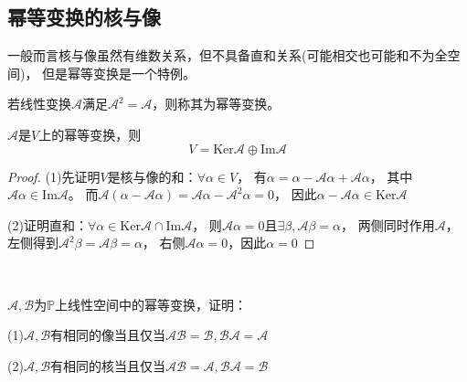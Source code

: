 \subsection{幂等变换的核与像}

一般而言核与像虽然有维数关系，但不具备直和关系(可能相交也可能和不为全空间)，
但是幂等变换是一个特例。

\begin{definition}[幂等变换]
  若线性变换$\mathcal{A}$满足$\mathcal{A}^2 = \mathcal{A}$，则称其为幂等变换。
\end{definition}

\begin{theorem}[幂等变换核像空间分解]
  $\mathcal{A}$是$V$上的幂等变换，则
  \begin{equation*}
    V = \mathrm{Ker}\mathcal{A} \oplus \mathrm{Im}\mathcal{A}
  \end{equation*}
\end{theorem}

\begin{proof}
  (1)先证明$V$是核与像的和：$\forall \alpha \in V$，
  有$\alpha = \alpha - \mathcal{A} \alpha + \mathcal{A} \alpha$，
  其中$\mathcal{A} \alpha \in \mathrm{Im}\mathcal{A}$。
  而$\mathcal{A}(\alpha - \mathcal{A} \alpha) = \mathcal{A} \alpha - \mathcal{A}^2 \alpha = 0$，
  因此$\alpha - \mathcal{A}\alpha \in \mathrm{Ker}\mathcal{A}$

  (2)证明直和：$\forall \alpha \in \mathrm{Ker}\mathcal{A} \cap \text{Im}\mathcal{A}$，
  则$\mathcal{A} \alpha = 0$且$\exists \beta, \mathcal{A} \beta = \alpha$，
  两侧同时作用$\mathcal{A}$，左侧得到$\mathcal{A}^2 \beta = \mathcal{A} \beta = \alpha$，
  右侧$\mathcal{A} \alpha = 0$，因此$\alpha = 0$
\end{proof}



~

\begin{exercise}[经典幂等变换核像题]
  $\mathcal{A}, \mathcal{B}$为$\mathbb{P}$上线性空间中的幂等变换，证明：

  (1)$\mathcal{A},\mathcal{B}$有相同的像当且仅当$\mathcal{A}\mathcal{B} = \mathcal{B}, \mathcal{B}\mathcal{A} = \mathcal{A}$

  (2)$\mathcal{A},\mathcal{B}$有相同的核当且仅当$\mathcal{A}\mathcal{B} = \mathcal{A}, \mathcal{B}\mathcal{A} = \mathcal{B}$
\end{exercise}

